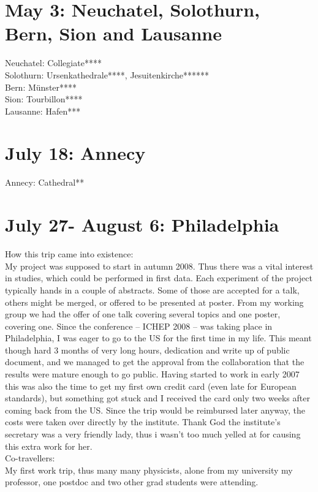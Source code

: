 \section{May 3: Neuchatel, Solothurn, Bern, Sion and Lausanne}
\label{2008:Swisstrip}

Neuchatel: Collegiate****\\
Solothurn: Ursenkathedrale****, Jesuitenkirche******\\
Bern: M\"unster****\\
Sion: Tourbillon****\\
Lausanne: Hafen***

\section{July 18: Annecy}
\label{2008:Annecy}

Annecy: Cathedral**

\section{July 27- August 6: Philadelphia}
\label{2008:Philadelphia}

How this trip came into existence:\\
My project was supposed to start in autumn 2008. Thus there was a vital interest in studies, which could be performed in first data. Each experiment of the project typically hands in a couple of abstracts. Some of those are accepted for a talk, others might be merged, or offered to be presented at poster. From my working group we had the offer of one talk covering several topics and one poster, covering one. Since the conference -- ICHEP 2008 -- was taking place in Philadelphia, I was eager to go to the US for the first time in my life. This meant though hard 3 months of very long hours, dedication and write up of public document, and we managed to get the approval from the collaboration that the results were mature enough to go public. Having started to work in early 2007 this was also the time to get my first own credit card (even late for European standards), but something got stuck and I received the card only two weeks after coming back from the US. Since the trip would be reimbursed later anyway, the costs were taken over directly by the institute. Thank God the institute's secretary was a very friendly lady, thus i wasn't too much yelled at for causing this extra work for her.\\

Co-travellers:\\
My first work trip, thus many many physicists, alone from my university my professor, one postdoc and two other grad students were attending.\\ 


